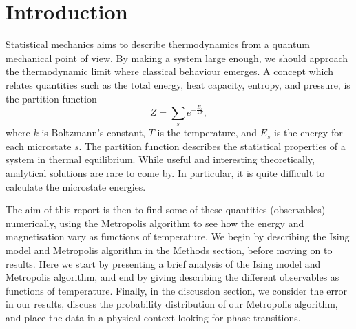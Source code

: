 \section{Introduction}
\label{sec:introduction}

Statistical mechanics aims to describe thermodynamics from a quantum mechanical point of view.
By making a system large enough, we should approach the thermodynamic limit where classical behaviour emerges. A concept which relates quantities such as the total energy, heat capacity, entropy, and pressure, is the partition function
  \begin{equation}
    \label{eq:partition}
    Z = \sum_s e^{-\frac{E_s}{kT}},
  \end{equation}
where $k$ is Boltzmann's constant, $T$ is the temperature, and $E_s$ is the energy for each microstate $s$.
The partition function describes the statistical properties of a system in thermal equilibrium.
While useful and interesting theoretically, analytical solutions are rare to come by. In particular,
it is quite difficult to calculate the microstate energies.

The aim of this report is then to find some of these quantities (observables) numerically, using the Metropolis algorithm to see how the energy and magnetisation vary as functions of temperature. We begin by describing the Ising model and Metropolis algorithm in the Methods section, before moving on to results. Here we start by presenting a brief analysis of the Ising model and Metropolis algorithm, and end by giving describing the different observables as functions of temperature. Finally, in the discussion section, we consider the error in our results, discuss the probability distribution of our Metropolis algorithm, and place the data in a physical context looking for phase transitions.
